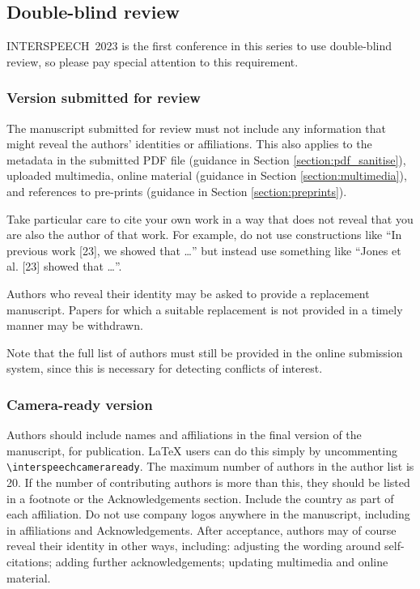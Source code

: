 \documentclass{INTERSPEECH2023}
\begin{document}
\subsection{Double-blind review}
\label{section:doubleblind}

INTERSPEECH~2023 is the first conference in this series to use double-blind review, so please pay special attention to this requirement.

\subsubsection{Version submitted for review}

The manuscript submitted for review must not include any information that might reveal the authors' identities or affiliations. This also applies to the metadata in the submitted PDF file (guidance in Section \ref{section:pdf_sanitise}), uploaded multimedia, online material (guidance in Section \ref{section:multimedia}), and references to pre-prints (guidance in Section \ref{section:preprints}).
 
Take particular care to cite your own work in a way that does not reveal that you are also the author of that work. For example, do not use constructions like ``In previous work [23], we showed that \ldots'' but instead use something like ``Jones et al. [23] showed that \ldots''.

Authors who reveal their identity may be asked to provide a replacement manuscript. Papers for which a suitable replacement is not provided in a timely manner may be withdrawn.

Note that the full list of authors must still be provided in the online submission system, since this is necessary for detecting conflicts of interest. 

\subsubsection{Camera-ready version}

Authors should include names and affiliations in the final version of the manuscript, for publication. \LaTeX\xspace users can do this simply by uncommenting  \texttt{\textbackslash interspeechcameraready}. The maximum number of authors in the author list is 20. If the number of contributing authors is more than this, they should be listed in a footnote or the Acknowledgements section. Include the country as part of each affiliation. Do not use company logos anywhere in the manuscript, including in affiliations and Acknowledgements. After acceptance, authors may of course reveal their identity in other ways, including: adjusting the wording around self-citations; adding further acknowledgements; updating multimedia and online material.
\end{document}
